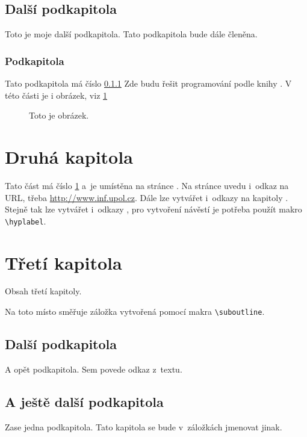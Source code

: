 \documentclass[twoside]{article}
\begin{document}
\subsection{Další podkapitola}
Toto je moje další podkapitola. Tato podkapitola bude dále členěna.

\subsubsection{Podkapitola}\label{podkapX}
Tato podkapitola má číslo \ref{podkapX} Zde budu řešit programování podle
knihy \cite{kovar}. V této části je i obrázek, viz \ref{obr}

\begin{figure}[ht]
  \centerline{}
  \caption{Toto je obrázek.} \label{obr}
\end{figure}

\cleardoublepage
\section{Druhá kapitola}\label{podkapY}
Tato část má číslo \ref{podkapY} a~je umístěna na stránce \pageref{podkapY}.
Na stránce uvedu i~odkaz na URL, třeba \url{http://www.inf.upol.cz}.
Dále lze vytvářet i~odkazy na kapitoly .
Stejně tak lze vytvářet i~odkazy ,
pro vytvoření návěstí je potřeba použít makro \verb|\hyplabel|.

\cleardoublepage
\section{Třetí kapitola}
Obsah třetí kapitoly.

\medskip
{}
Na toto místo směřuje záložka vytvořená pomocí makra \verb|\suboutline|.

\subsection{Další podkapitola}
A opět podkapitola. Sem povede odkaz z~textu.

\subsection{A ještě další podkapitola}
Zase jedna podkapitola. Tato kapitola se bude v~záložkách jmenovat jinak.
\end{document}
